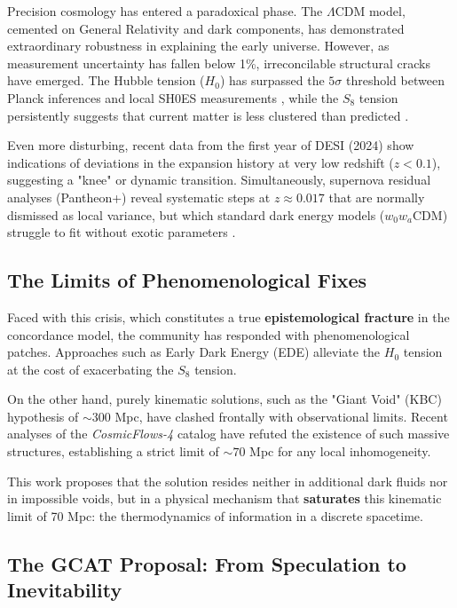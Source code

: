 \documentclass[12pt, a4paper]{article}
\theoremstyle{plain}
\theoremstyle{definition}
\begin{document}
Precision cosmology has entered a paradoxical phase. The $\Lambda$CDM model, cemented on General Relativity and dark components, has demonstrated extraordinary robustness in explaining the early universe. However, as measurement uncertainty has fallen below 1\%, irreconcilable structural cracks have emerged. The Hubble tension ($H_0$) has surpassed the $5\sigma$ threshold between Planck inferences and local SH0ES measurements \cite{Riess2022}, while the $S_8$ tension persistently suggests that current matter is less clustered than predicted \cite{KiDS2021, DES2022}.

Even more disturbing, recent data from the first year of DESI (2024) show indications of deviations in the expansion history at very low redshift ($z < 0.1$), suggesting a "knee" or dynamic transition. Simultaneously, supernova residual analyses (Pantheon+) reveal systematic steps at $z \approx 0.017$ that are normally dismissed as local variance, but which standard dark energy models ($w_0w_a$CDM) struggle to fit without exotic parameters \cite{DESI2024, Brout2022}.

\subsection{The Limits of Phenomenological Fixes}

Faced with this crisis, which constitutes a true \textbf{epistemological fracture} in the concordance model, the community has responded with phenomenological patches. Approaches such as Early Dark Energy (EDE) alleviate the $H_0$ tension at the cost of exacerbating the $S_8$ tension.

On the other hand, purely kinematic solutions, such as the "Giant Void" (KBC) hypothesis of $\sim 300$ Mpc, have clashed frontally with observational limits. Recent analyses of the \textit{CosmicFlows-4} catalog \cite{Mazurenko2024} have refuted the existence of such massive structures, establishing a strict limit of $\sim 70$ Mpc for any local inhomogeneity.

This work proposes that the solution resides neither in additional dark fluids nor in impossible voids, but in a physical mechanism that \textbf{saturates} this kinematic limit of 70 Mpc: the thermodynamics of information in a discrete spacetime.

\subsection{The GCAT Proposal: From Speculation to Inevitability}
\end{document}
